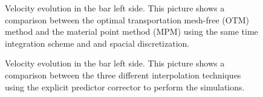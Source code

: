 \documentclass{article}
\begin{document}
\begin{figure}\sidecaption
  \centering
  \caption{Velocity evolution in the bar left side. This picture
    shows a comparison between the optimal transportation mesh-free
    (OTM) method and the material point method (MPM) using the same
    time integration scheme and and spacial discretization.}
  \label{fig:Velocity-Dyka-MPM-vs-OTM}
\end{figure}

\begin{figure}\sidecaption
  \centering
  \caption{Velocity evolution in the bar left side. This picture
    shows a comparison between the three different interpolation
    techniques using the explicit predictor corrector to perform the
    simulations.}
  \label{fig:Velocity-Dyka-Q4-uGIMP-LME}
\end{figure}
\end{document}
